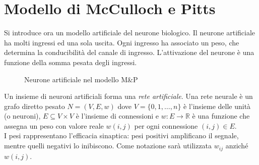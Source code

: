 \section{Modello di McCulloch e Pitts} %
\label{sec:modello_di_mcculloch_e_pitts}
Si introduce ora un modello artificiale del neurone biologico. Il neurone artificiale ha molti ingressi ed una sola uscita. Ogni ingresso ha associato un peso, che determina la conducibilità del canale di ingresso. L’attivazione del neurone è una funzione della somma pesata degli ingressi.
\begin{figure}[h!]
    \centering
    \caption{Neurone artificiale nel modello M\&P}
\end{figure}
Un insieme di neuroni artificiali forma una \emph{rete artificiale}. Una rete neurale è un grafo diretto pesato $N=(V,E,w)$ dove $V=\{ 0,1,\dots, n\}$ è l'insieme delle unità (o neuroni), $E \subseteq V \times V$ è l'insieme di connessioni e $w:E \rightarrow \mathbb{R}$ è una funzione che assegna un peso con valore reale $w(i,j)$ per ogni connessione $(i,j)\in E$.\\

I pesi rappresentano l'efficacia sinaptica: pesi positivi amplificano il segnale, mentre quelli negativi lo inibiscono. Come notazione sarà utilizzata $w_{ij}$ anziché $w(i,j)$.\\

